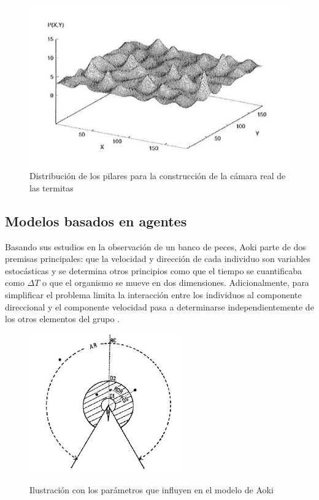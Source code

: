 \begin{figure}[h!]
    \centering
    \includegraphics[height=7cm]{fig/cap02/distrubucionPilaresTermitas.JPG}
    \caption{Distribución de los pilares para la construcción de la cámara real de las termitas}
    \label{fig:pillarsTermites}
\end{figure}

\subsection{Modelos basados en agentes}\label{s2_2_2}
Basando sus estudios en la observación de un banco de peces, Aoki parte de dos premisas principales: que la velocidad y dirección de cada individuo son variables estocásticas y se determina otros principios como que el tiempo se cuantificaba como \(\Delta T\) o que el organismo se mueve en dos dimensiones. Adicionalmente, para simplificar el problema limita la interacción entre los individuos al componente direccional y el componente velocidad pasa a determinarse independientemente de los otros elementos del grupo \cite{aoki1982simulation}. 

\begin{figure}[!h]
    \centering
    {\includegraphics[height=6cm]{fig/cap02/movimientoPecesAoiki.JPG}}
    \caption{Ilustración con los parámetros que influyen en el modelo de Aoki}
    \label{fig:aokiFishInteractions}
\end{figure}\label{fig:aokifish}

